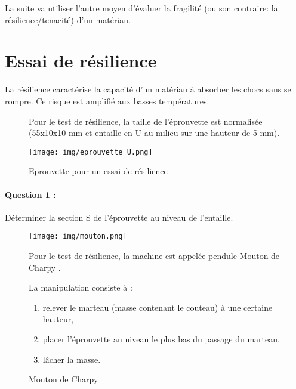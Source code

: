 La suite va utiliser l'autre moyen d'évaluer la fragilité (ou son contraire: la résilience/tenacité) d'un matériau.

\section{Essai de résilience}

La résilience caractérise la capacité d'un matériau à absorber les chocs sans se rompre. Ce risque est amplifié aux basses températures. 

 \begin{figure}[!h]
 \begin{minipage}{0.45\linewidth}
Pour le test de résilience, la taille de l'éprouvette est normalisée (55x10x10 mm et entaille en U au milieu sur une hauteur de 5 mm).
 \end{minipage}
\hfill
 \begin{minipage}{0.45\linewidth}
  \centering\texttt{[image: img/eprouvette\_U.png]}
  \caption{Eprouvette pour un essai de résilience}
  \label{img:image5}
 \end{minipage}
\end{figure}

\paragraph{Question 1 :} Déterminer la section S de l'éprouvette au niveau de l'entaille.

 \begin{figure}[!h]
 \begin{minipage}{0.5\linewidth}
\centering\texttt{[image: img/mouton.png]}
  \caption{\og Mouton de Charpy \fg}
  \label{img:image6}
 \end{minipage}
\hfill
 \begin{minipage}{0.49\linewidth}
Pour le test de résilience, la machine est appelée pendule \og Mouton de Charpy \fg.

La manipulation consiste à :
\begin{enumerate}
 \item relever le marteau (masse contenant le couteau) à une certaine hauteur,
 \item placer l'éprouvette au niveau le plus bas du passage du marteau,
 \item lâcher la masse.
\end{enumerate}
 \end{minipage}
\end{figure}

